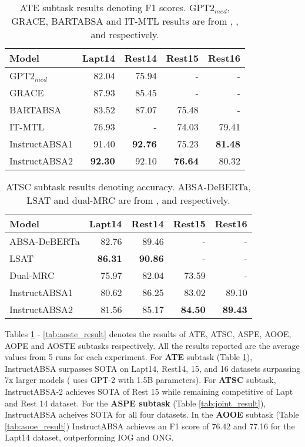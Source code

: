 \documentclass[11pt]{article}
\newcommand{\name}{\textsc{I}nstruct\textsc{ABSA}\xspace}
\begin{document}
\begin{table}[t!]
\centering
\resizebox{\columnwidth}{!}
{
\begin{tabular}{lrrrr}
\hline
\textbf{Model} & \textbf{Lapt14} & \textbf{Rest14} & \textbf{Rest15} & \textbf{Rest16} \\ \hline
GPT2$_{med}$  & 82.04 & 75.94 & - & - \\
GRACE                & 87.93 & 85.45 & - & - \\ 
BARTABSA                & 83.52 & 87.07 & 75.48 & - \\ 
IT-MTL                & 76.93 & - & 74.03 & 79.41 \\ \hline
\name{}1 & 91.40 & \textbf{92.76} & 75.23 & \textbf{81.48} \\
\name{}2 & \textbf{92.30} & 92.10 & \textbf{76.64} & 80.32 \\ \hline
\end{tabular}
}
\caption{ATE subtask results denoting F1 scores. GPT2$_{med}$, GRACE, BARTABSA and IT-MTL results are from \citet{hosseini-asl-etal-2022-generative}, \citet{luo-etal-2020-grace}, \citet{yan-etal-2021-unified} and \citet{varia2023instruction} respectively.}

\label{tab:ate_result}
\end{table} \begin{table}[t!]
\centering
\resizebox{\columnwidth}{!}
{
\begin{tabular}{lrrrr}
\hline
\textbf{Model} & \textbf{Lapt14} & \textbf{Rest14} & \textbf{Rest15} & \textbf{Rest16} \\ \hline
ABSA-DeBERTa        & 82.76 & 89.46 & - & - \\
LSAT       & \textbf{86.31} & \textbf{90.86} & - & - \\ 
Dual-MRC          & 75.97 & 82.04 & 73.59 & - \\ \hline
\name{}1 & 80.62 & 86.25 & 83.02 & 89.10 \\
\name{}2 & 81.56 & 85.17 & \textbf{84.50} & \textbf{89.43} \\ \hline
\end{tabular}
}
\caption{ATSC subtask results denoting accuracy. ABSA-DeBERTa, LSAT and dual-MRC are from \citet{Marcacini2021AspectbasedSA}, \citet{yang2021improving} and \citet{mao2021joint} respectively.}
\label{tab:atsc_result}
\end{table}
 
Tables \ref{tab:ate_result} - \ref{tab:aoste_result} denotes the results of ATE, ATSC, ASPE, AOOE, AOPE and AOSTE subtasks respectively. 
All the results reported are the average values from 5 runs for each experiment.
For \textbf{ATE} subtask (Table \ref{tab:ate_result}), \name{} surpasses SOTA on Lapt14, Rest14, 15, and 16 datasets surpassing 7x larger models (\citet{hosseini-asl-etal-2022-generative} uses GPT-2 with 1.5B parameters).
For \textbf{ATSC} subtask, \name{}-2 achieves SOTA of Rest 15 while remaining competitive of Lapt and Rest 14 dataset.
For the \textbf{ASPE subtask} (Table \ref{tab:joint_result}), \name{} acheives SOTA for all four datasets. 
In the \textbf{AOOE} subtask (Table \ref{tab:aooe_result}) \name{} achieves an F1 score of 76.42 and 77.16 for the Lapt14 dataset, outperforming IOG and ONG. 
\end{document}
